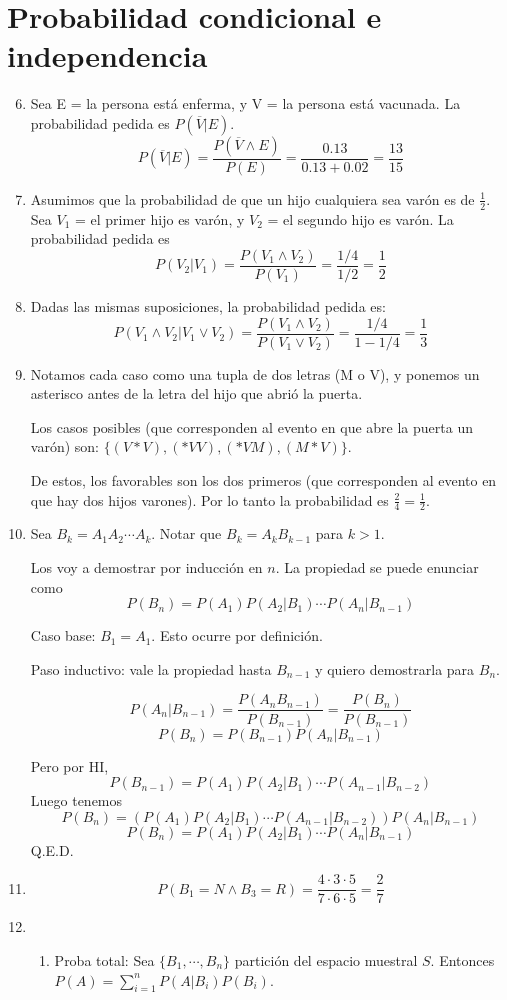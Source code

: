 \section{Probabilidad condicional e independencia}
\begin{enumerate}
	\setcounter{enumi}{5}
	\item
		Sea E = la persona está enferma, y V = la persona está vacunada.
		La probabilidad pedida es $P(\overline V | E)$.
		$$P(\overline V | E) = \frac{P(\overline V \land E)}{P(E)} = \frac{0.13}{0.13+0.02} = \frac{13}{15}$$
	\item
		Asumimos que la probabilidad de que un hijo cualquiera sea varón es de $\frac{1}{2}$.
		Sea $V_1$ = el primer hijo es varón, y $V_2$ = el segundo hijo es varón.
		La probabilidad pedida es
		$$P(V_2|V_1) = \frac{P(V_1 \land V_2)}{P(V_1)} = \frac{1/4}{1/2} = \frac{1}{2}$$
	\item
		Dadas las mismas suposiciones, la probabilidad pedida es:
		$$P(V_1 \land V_2|V_1 \lor V_2) = \frac{P(V_1 \land V_2)}{P(V_1 \lor V_2)} = \frac{1/4}{1-1/4} = \frac{1}{3}$$
	\item
		Notamos cada caso como una tupla de dos letras (M o V), y ponemos un asterisco antes de la letra del hijo que abrió la puerta.
		
		Los casos posibles (que corresponden al evento en que abre la puerta un varón) son: $\{(V*V), (*VV), (*VM), (M*V)\}$.
		
		De estos, los favorables son los dos primeros (que corresponden al evento en que hay dos hijos varones). Por lo tanto la probabilidad es $\frac{2}{4} = \frac{1}{2}$.
	\item
		Sea $B_k = A_1A_2\cdots A_k$. Notar que $B_k = A_k B_{k-1}$ para $k>1$.
		
		Los voy a demostrar por inducción en $n$. La propiedad se puede enunciar como $$P(B_n) = P(A_1) P(A_2|B_1) \cdots P(A_n|B_{n-1})$$
		
		Caso base: $B_1 = A_1$. Esto ocurre por definición.
		
		Paso inductivo: vale la propiedad hasta $B_{n-1}$ y quiero demostrarla para $B_n$.
		
		$$P(A_n | B_{n-1}) = \frac{P(A_n B_{n-1})}{P(B_{n-1})} = \frac{P(B_n)}{P(B_{n-1})}$$
		$$P(B_n) = P(B_{n-1}) P(A_n | B_{n-1})$$
		
		Pero por HI, $$P(B_{n-1}) = P(A_1) P(A_2|B_1) \cdots P(A_{n-1}|B_{n-2})$$
		Luego tenemos
		$$P(B_n) = (P(A_1) P(A_2|B_1) \cdots P(A_{n-1}|B_{n-2})) P(A_n | B_{n-1})$$
		$$P(B_n) = P(A_1) P(A_2|B_1) \cdots P(A_n|B_{n-1})$$
		Q.E.D.
	\item
		$$P(B_1 = N \land B_3 = R) = \frac{4\cdot 3\cdot 5}{7\cdot 6\cdot 5} = \frac{2}{7}$$
	\item
		\begin{enumerate}
		\item Proba total:
			Sea $\{B_1, \cdots, B_n\}$ partición del espacio muestral $S$. Entonces $P(A) = \sum_{i=1}^{n} P(A|B_i)P(B_i)$.
			

\end{enumerate}
\end{enumerate}
